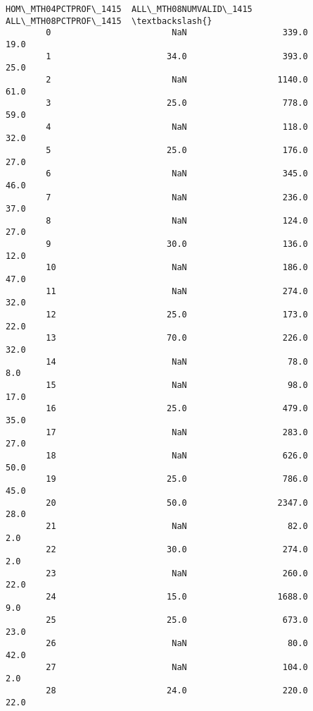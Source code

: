 \documentclass[11pt]{article}
\begin{document}
\begin{Verbatim}[commandchars=\\\{\}]
               HOM\_MTH04PCTPROF\_1415  ALL\_MTH08NUMVALID\_1415  ALL\_MTH08PCTPROF\_1415  \textbackslash{}
        0                        NaN                   339.0                   19.0   
        1                       34.0                   393.0                   25.0   
        2                        NaN                  1140.0                   61.0   
        3                       25.0                   778.0                   59.0   
        4                        NaN                   118.0                   32.0   
        5                       25.0                   176.0                   27.0   
        6                        NaN                   345.0                   46.0   
        7                        NaN                   236.0                   37.0   
        8                        NaN                   124.0                   27.0   
        9                       30.0                   136.0                   12.0   
        10                       NaN                   186.0                   47.0   
        11                       NaN                   274.0                   32.0   
        12                      25.0                   173.0                   22.0   
        13                      70.0                   226.0                   32.0   
        14                       NaN                    78.0                    8.0   
        15                       NaN                    98.0                   17.0   
        16                      25.0                   479.0                   35.0   
        17                       NaN                   283.0                   27.0   
        18                       NaN                   626.0                   50.0   
        19                      25.0                   786.0                   45.0   
        20                      50.0                  2347.0                   28.0   
        21                       NaN                    82.0                    2.0   
        22                      30.0                   274.0                    2.0   
        23                       NaN                   260.0                   22.0   
        24                      15.0                  1688.0                    9.0   
        25                      25.0                   673.0                   23.0   
        26                       NaN                    80.0                   42.0   
        27                       NaN                   104.0                    2.0   
        28                      24.0                   220.0                   22.0   

\end{Verbatim}
\end{document}
